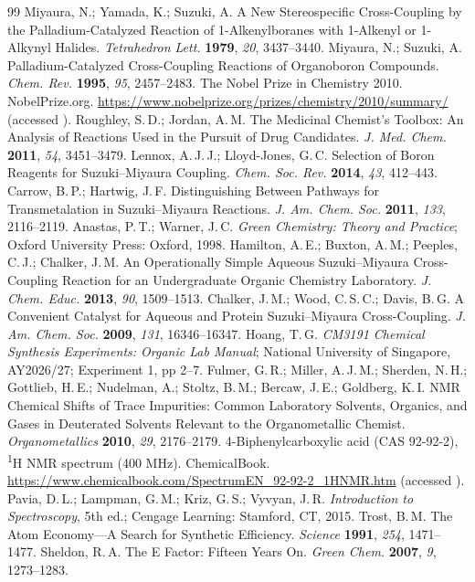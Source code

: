 \documentclass[11pt,a4paper]{article}
\newcommand{\res}[1]{\fcolorbox{black}{gray!18}{\footnotesize\sffamily #1}}
\begin{document}
\begin{thebibliography}{99}
\small
\setlength{\itemsep}{1pt}
 Miyaura, N.; Yamada, K.; Suzuki, A. A New Stereospecific Cross-Coupling by the Palladium-Catalyzed Reaction of 1-Alkenylboranes with 1-Alkenyl or 1-Alkynyl Halides. \emph{Tetrahedron Lett.} \textbf{1979}, \emph{20}, 3437--3440.
 Miyaura, N.; Suzuki, A. Palladium-Catalyzed Cross-Coupling Reactions of Organoboron Compounds. \emph{Chem. Rev.} \textbf{1995}, \emph{95}, 2457--2483.
 The Nobel Prize in Chemistry 2010. NobelPrize.org. \url{https://www.nobelprize.org/prizes/chemistry/2010/summary/} (accessed \res{date}).
 Roughley, S.\,D.; Jordan, A.\,M. The Medicinal Chemist's Toolbox: An Analysis of Reactions Used in the Pursuit of Drug Candidates. \emph{J. Med. Chem.} \textbf{2011}, \emph{54}, 3451--3479.
 Lennox, A.\,J.\,J.; Lloyd-Jones, G.\,C. Selection of Boron Reagents for Suzuki--Miyaura Coupling. \emph{Chem. Soc. Rev.} \textbf{2014}, \emph{43}, 412--443.
 Carrow, B.\,P.; Hartwig, J.\,F. Distinguishing Between Pathways for Transmetalation in Suzuki--Miyaura Reactions. \emph{J. Am. Chem. Soc.} \textbf{2011}, \emph{133}, 2116--2119.
 Anastas, P.\,T.; Warner, J.\,C. \emph{Green Chemistry: Theory and Practice}; Oxford University Press: Oxford, 1998.
 Hamilton, A.\,E.; Buxton, A.\,M.; Peeples, C.\,J.; Chalker, J.\,M. An Operationally Simple Aqueous Suzuki--Miyaura Cross-Coupling Reaction for an Undergraduate Organic Chemistry Laboratory. \emph{J. Chem. Educ.} \textbf{2013}, \emph{90}, 1509--1513.
 Chalker, J.\,M.; Wood, C.\,S.\,C.; Davis, B.\,G. A Convenient Catalyst for Aqueous and Protein Suzuki--Miyaura Cross-Coupling. \emph{J. Am. Chem. Soc.} \textbf{2009}, \emph{131}, 16346--16347.
 Hoang, T.\,G. \emph{CM3191 Chemical Synthesis Experiments: Organic Lab Manual}; National University of Singapore, AY2026/27; Experiment 1, pp 2--7.
 Fulmer, G.\,R.; Miller, A.\,J.\,M.; Sherden, N.\,H.; Gottlieb, H.\,E.; Nudelman, A.; Stoltz, B.\,M.; Bercaw, J.\,E.; Goldberg, K.\,I. NMR Chemical Shifts of Trace Impurities: Common Laboratory Solvents, Organics, and Gases in Deuterated Solvents Relevant to the Organometallic Chemist. \emph{Organometallics} \textbf{2010}, \emph{29}, 2176--2179.
 4-Biphenylcarboxylic acid (CAS 92-92-2), \textsuperscript{1}H NMR spectrum (400 MHz). ChemicalBook. \url{https://www.chemicalbook.com/SpectrumEN_92-92-2_1HNMR.htm} (accessed \res{date}).
 Pavia, D.\,L.; Lampman, G.\,M.; Kriz, G.\,S.; Vyvyan, J.\,R. \emph{Introduction to Spectroscopy}, 5th ed.; Cengage Learning: Stamford, CT, 2015.
 Trost, B.\,M. The Atom Economy---A Search for Synthetic Efficiency. \emph{Science} \textbf{1991}, \emph{254}, 1471--1477.
 Sheldon, R.\,A. The E Factor: Fifteen Years On. \emph{Green Chem.} \textbf{2007}, \emph{9}, 1273--1283.
\end{thebibliography}
\end{document}
